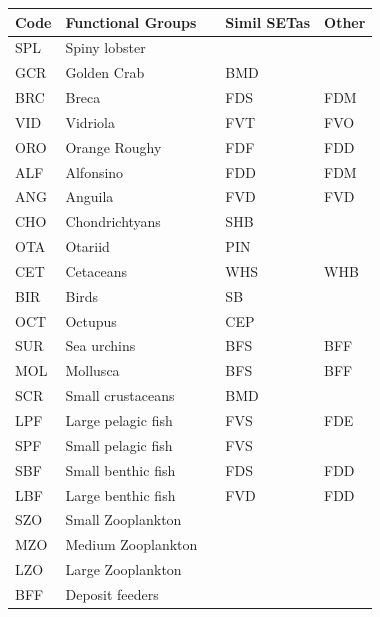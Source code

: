 \documentclass[11pt]{article}
\begin{document}
\begin{center}
\begin{tabular}{lllll}
 Code  &  Functional Groups     &     &  Simil SETas  &  Other  \\
\hline
 SPL   &  Spiny lobster         &     &               &         \\
 GCR   &  Golden Crab           &     &  BMD          &         \\
 BRC   &  Breca                 &     &  FDS          &  FDM    \\
 VID   &  Vidriola              &     &  FVT          &  FVO    \\
 ORO   &  Orange Roughy         &     &  FDF          &  FDD    \\
 ALF   &  Alfonsino             &     &  FDD          &  FDM    \\
 ANG   &  Anguila               &     &  FVD          &  FVD    \\
 CHO   &  Chondrichtyans        &     &  SHB          &         \\
 OTA   &  Otariid               &     &  PIN          &         \\
 CET   &  Cetaceans             &     &  WHS          &  WHB    \\
 BIR   &  Birds                 &     &  SB           &         \\
 OCT   &  Octupus               &     &  CEP          &         \\
 SUR   &  Sea urchins           &     &  BFS          &  BFF    \\
 MOL   &  Mollusca              &     &  BFS          &  BFF    \\
 SCR   &  Small crustaceans     &     &  BMD          &         \\
 LPF   &  Large pelagic fish    &     &  FVS          &  FDE    \\
 SPF   &  Small pelagic fish    &     &  FVS          &         \\
 SBF   &  Small benthic fish    &     &  FDS          &  FDD    \\
 LBF   &  Large benthic fish    &     &  FVD          &  FDD    \\
 SZO   &  Small Zooplankton     &     &               &         \\
 MZO   &  Medium Zooplankton    &     &               &         \\
 LZO   &  Large Zooplankton     &     &               &         \\
 BFF   &  Deposit feeders       &     &               &         \\

\end{tabular}
\end{center}
\end{document}
